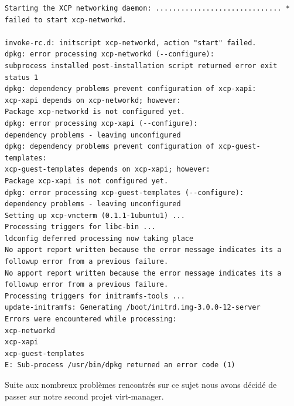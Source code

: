 \begin{lstlisting}
Starting the XCP networking daemon: .............................. * failed to start xcp-networkd.

invoke-rc.d: initscript xcp-networkd, action "start" failed.
dpkg: error processing xcp-networkd (--configure):
subprocess installed post-installation script returned error exit status 1
dpkg: dependency problems prevent configuration of xcp-xapi:
xcp-xapi depends on xcp-networkd; however:
Package xcp-networkd is not configured yet.
dpkg: error processing xcp-xapi (--configure):
dependency problems - leaving unconfigured
dpkg: dependency problems prevent configuration of xcp-guest-templates:
xcp-guest-templates depends on xcp-xapi; however:
Package xcp-xapi is not configured yet.
dpkg: error processing xcp-guest-templates (--configure):
dependency problems - leaving unconfigured
Setting up xcp-vncterm (0.1.1-1ubuntu1) ...
Processing triggers for libc-bin ...
ldconfig deferred processing now taking place
No apport report written because the error message indicates its a followup error from a previous failure.
No apport report written because the error message indicates its a followup error from a previous failure.
Processing triggers for initramfs-tools ...
update-initramfs: Generating /boot/initrd.img-3.0.0-12-server
Errors were encountered while processing:
xcp-networkd
xcp-xapi
xcp-guest-templates
E: Sub-process /usr/bin/dpkg returned an error code (1)
\end{lstlisting}

Suite aux nombreux problèmes rencontrés sur ce sujet nous avons décidé de passer sur notre second projet virt-manager.

